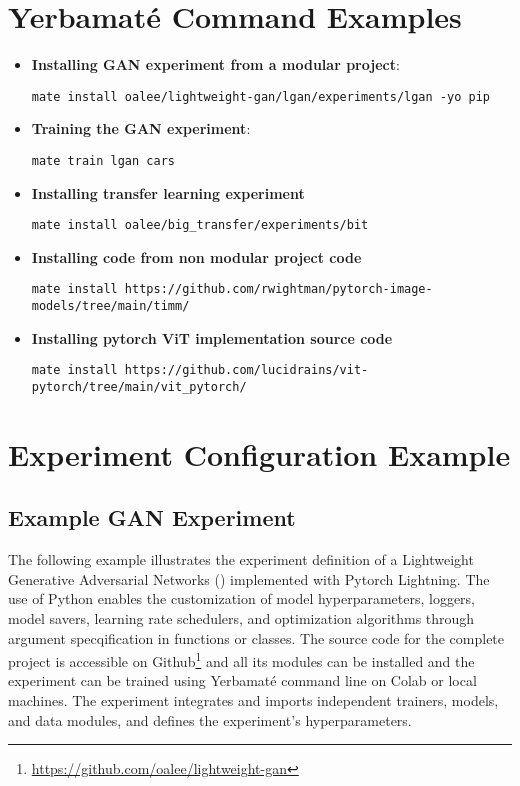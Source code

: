 

\onecolumn

\section{Yerbamaté Command Examples}

\begin{itemize}
    \item \textbf{Installing GAN experiment from a modular project}: 
    
    \texttt{mate install oalee/lightweight-gan/lgan/experiments/lgan -yo pip}
    \item \textbf{Training the GAN experiment}: 
    
    \texttt{mate train lgan cars}
    
    \item \textbf{Installing transfer learning experiment}

    \texttt{mate install oalee/big\_transfer/experiments/bit}
    
    \item \textbf{Installing code from non modular project code}

    \texttt{mate install https://github.com/rwightman/pytorch-image-models/tree/main/timm/}

    \item \textbf{Installing pytorch ViT implementation source code}
    
    \texttt{mate install https://github.com/lucidrains/vit-pytorch/tree/main/vit\_pytorch/}

\end{itemize}


\section{Experiment Configuration Example}

\subsection{Example GAN Experiment}

The following example illustrates the experiment definition of a Lightweight Generative Adversarial Networks (\cite{lgan,goodfellow2020generative}) implemented with Pytorch Lightning. The use of Python enables the customization of model hyperparameters, loggers, model savers, learning rate schedulers, and optimization algorithms through argument specqification in functions or classes. The source code for the complete project is accessible on Github\footnote{\url{https://github.com/oalee/lightweight-gan}} and all its modules can be installed and the experiment can be trained using Yerbamaté command line on Colab or local machines. The experiment integrates and imports independent trainers, models, and data modules, and defines the experiment's hyperparameters.

